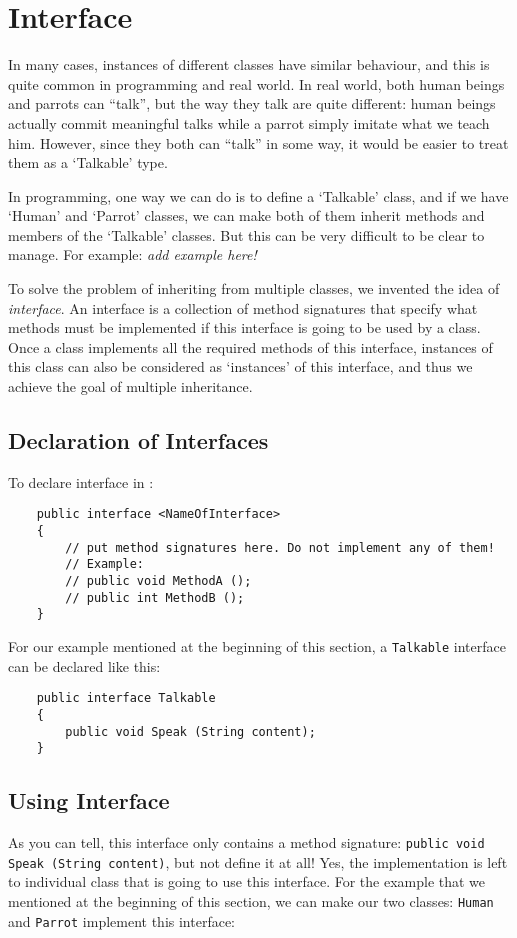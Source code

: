 \documentclass[../main.tex]{subfiles}
\begin{document}
\section{Interface}
In many cases, instances of different classes have similar behaviour, and this
is quite common in programming and real world. In real world, both human beings
and parrots can ``talk'', but the way they talk are quite different: human
beings actually commit meaningful talks while a parrot simply imitate what we
teach him. However, since they both can ``talk'' in some way, it would be easier
to treat them as a `Talkable' type.

In programming, one way we can do is to define a `Talkable' class, and if we
have `Human' and `Parrot' classes, we can make both of them inherit methods and
members of the `Talkable' classes. But this can be very difficult to be clear to
manage. For example: \emph{add example here!}

To solve the problem of inheriting from multiple classes, we invented the idea
of \emph{interface}. An interface is a collection of method signatures that
specify what methods must be implemented if this interface is going to be used
by a class. Once a class implements all the required methods of this interface,
instances of this class can also be considered as `instances' of this interface,
and thus we achieve the goal of multiple inheritance.


\subsection{Declaration of Interfaces}
To declare interface in \csharp:

\begin{verbatim}
    public interface <NameOfInterface>
    {
        // put method signatures here. Do not implement any of them!
        // Example:
        // public void MethodA ();
        // public int MethodB ();
    }
\end{verbatim}

For our example mentioned at the beginning of this section, a \texttt{Talkable}
interface can be declared like this:
\begin{verbatim}
    public interface Talkable
    {
        public void Speak (String content);
    }
\end{verbatim}

\subsection{Using Interface}
As you can tell, this interface only contains a method signature:
\texttt{public void Speak (String content)}, but not define it at all! Yes, the
implementation is left to individual class that is going to use this interface.
For the example that we mentioned at the beginning of this section, we can make
our two classes: \texttt{Human} and \texttt{Parrot} implement this interface:
\end{document}
